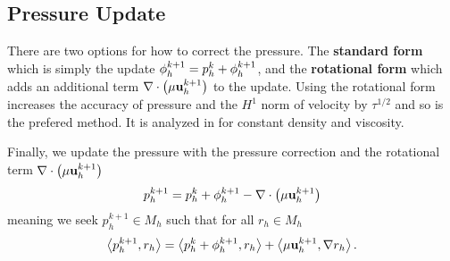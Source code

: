 \documentclass[letterpaper]{erdc}
\begin{document}
\subsection{Pressure Update}\label{sec:bdf2pressureupdate}
\begin{remark}
  There are two options for how to correct the pressure.  The \textbf{standard form} which is simply the update $\phi_h^{k+1} = p_h^{k} + \phi_h^{k+1}$, and the \textbf{rotational form} which adds an additional term $\nabla\cdot\left(\mu\textbf{u}^{k+1}_h\right)$ to the update.  Using the rotational form increases the accuracy of pressure and the $H^1$ norm of velocity by $\tau^{1/2}$ and so is the prefered method.  It is analyzed in \cite{guermond2004error} for constant density and viscosity.
\end{remark}
Finally, we update the pressure with the pressure correction and the rotational term $\nabla\cdot\left(\mu\textbf{u}^{k+1}_h\right)$
\begin{equation}
  p_h^{k+1} = p_h^{k} + \phi_h^{k+1} - \nabla\cdot\left(\mu\textbf{u}^{k+1}_h\right)
\end{equation}
meaning we seek $p_h^{k+1}\in M_h$ such that for all $r_h\in M_h$
\begin{equation}
  \left\langle p_h^{k+1}, r_h \right\rangle = \left\langle p_h^{k} + \phi_h^{k+1}, r_h \right\rangle + \left\langle \mu\textbf{u}_h^{k+1}, \nabla r_h \right\rangle.
\end{equation}
\end{document}
